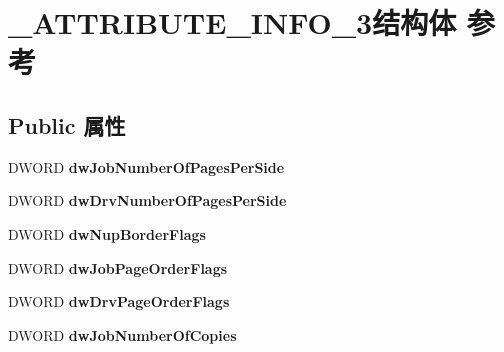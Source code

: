 \hypertarget{struct___a_t_t_r_i_b_u_t_e___i_n_f_o__3}{}\section{\+\_\+\+A\+T\+T\+R\+I\+B\+U\+T\+E\+\_\+\+I\+N\+F\+O\+\_\+3结构体 参考}
\label{struct___a_t_t_r_i_b_u_t_e___i_n_f_o__3}
\subsection*{Public 属性}
\begin{DoxyCompactItemize}
\item 
\mbox{\label{struct___a_t_t_r_i_b_u_t_e___i_n_f_o__3_a1b00b58e7e9f7b02d52b48e5d777da65}} 
D\+W\+O\+RD {\bfseries dw\+Job\+Number\+Of\+Pages\+Per\+Side}
\item 
\mbox{\label{struct___a_t_t_r_i_b_u_t_e___i_n_f_o__3_a2b5c2ee1b766bf41e60770fdf3fad7c2}} 
D\+W\+O\+RD {\bfseries dw\+Drv\+Number\+Of\+Pages\+Per\+Side}
\item 
\mbox{\label{struct___a_t_t_r_i_b_u_t_e___i_n_f_o__3_a4ca12cbaea7df95ac522e737d7ac9cdd}} 
D\+W\+O\+RD {\bfseries dw\+Nup\+Border\+Flags}
\item 
\mbox{\label{struct___a_t_t_r_i_b_u_t_e___i_n_f_o__3_ab43339be1c96439d44849bd59451cb54}} 
D\+W\+O\+RD {\bfseries dw\+Job\+Page\+Order\+Flags}
\item 
\mbox{\label{struct___a_t_t_r_i_b_u_t_e___i_n_f_o__3_ad5de7c1b33f08a782f97b1fbf5e2793e}} 
D\+W\+O\+RD {\bfseries dw\+Drv\+Page\+Order\+Flags}
\item 
\mbox{\label{struct___a_t_t_r_i_b_u_t_e___i_n_f_o__3_af8202811318871ca5063c05df1f04d41}} 
D\+W\+O\+RD {\bfseries dw\+Job\+Number\+Of\+Copies}
\item 
\mbox{\label{struct___a_t_t_r_i_b_u_t_e___i_n_f_o__3_ace815f9c967c9c46e50297ca3a541625}} 

\end{DoxyCompactItemize}
